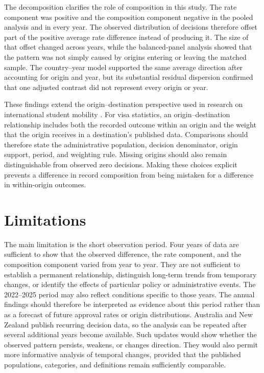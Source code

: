 \documentclass[runningheads]{llncs}
\begin{document}
The decomposition clarifies the role of composition in this study. The rate component was positive and the composition component negative in the pooled analysis and in every year. The observed distribution of decisions therefore offset part of the positive average rate difference instead of producing it. The size of that offset changed across years, while the balanced-panel analysis showed that the pattern was not simply caused by origins entering or leaving the matched sample. The country--year model supported the same average direction after accounting for origin and year, but its substantial residual dispersion confirmed that one adjusted contrast did not represent every origin or year.

These findings extend the origin--destination perspective used in research on international student mobility \cite{PerkinsNeumayer2014,Weber2023}. For visa statistics, an origin--destination relationship includes both the recorded outcome within an origin and the weight that the origin receives in a destination's published data. Comparisons should therefore state the administrative population, decision denominator, origin support, period, and weighting rule. Missing origins should also remain distinguishable from observed zero decisions. Making these choices explicit prevents a difference in record composition from being mistaken for a difference in within-origin outcomes.

\section{Limitations}

The main limitation is the short observation period. Four years of data are sufficient to show that the observed difference, the rate component, and the composition component varied from year to year. They are not sufficient to establish a permanent relationship, distinguish long-term trends from temporary changes, or identify the effects of particular policy or administrative events. The 2022--2025 period may also reflect conditions specific to those years. The annual findings should therefore be interpreted as evidence about this period rather than as a forecast of future approval rates or origin distributions. Australia and New Zealand publish recurring decision data, so the analysis can be repeated after several additional years become available. Such updates would show whether the observed pattern persists, weakens, or changes direction. They would also permit more informative analysis of temporal changes, provided that the published populations, categories, and definitions remain sufficiently comparable.
\end{document}
